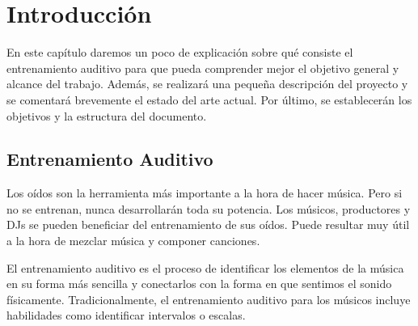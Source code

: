 \documentclass[12pt,twoside,titlepage]{report}
\begin{document}

\pagestyle{fancy}
\renewcommand{\chaptermark}[1]{\markboth{Capítulo \thechapter.\ #1}{}}
\pagestyle{fancy}
\fancyhf{}
\fancyhead[LO]{\leftmark}
\fancyhead[RO]{}
\fancyhead[RE]{\nouppercase\rightmark}
\fancyhead[LE]{}
\fancyfoot[C]{\thepage}


   


\chapter{Introducción}

En este capítulo daremos un poco de explicación sobre qué consiste el entrenamiento auditivo para que pueda comprender mejor el objetivo general y alcance del trabajo. Además, se realizará una pequeña descripción del proyecto y se comentará brevemente el estado del arte actual. Por último, se establecerán los objetivos y la estructura del documento.

\pagestyle{fancy}

\setlength{\parskip}{0.75em}
\renewcommand{\baselinestretch}{1.25}


\setcounter{page}{1}

\section{Entrenamiento Auditivo}

Los oídos son la herramienta más importante a la hora de hacer música. Pero si no se entrenan, nunca desarrollarán toda su potencia. Los músicos, productores y DJs se pueden beneficiar del entrenamiento de sus oídos. Puede resultar muy útil a la hora de mezclar música y componer canciones.

El entrenamiento auditivo es el proceso de identificar los elementos de la música en su forma más sencilla y conectarlos con la forma en que sentimos el sonido físicamente. Tradicionalmente, el entrenamiento auditivo para los músicos incluye habilidades como identificar intervalos o escalas. 
\end{document}
